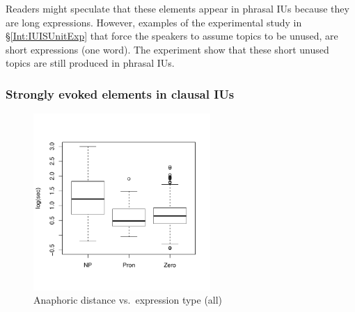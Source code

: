 Readers might speculate that
these elements appear in phrasal IUs because they are long expressions.
However, examples of the experimental study in \S \ref{Int:IUISUnitExp} that force the speakers to assume topics to be unused,
are short expressions (one word).
The experiment show that
these short unused topics are still produced in phrasal IUs.


\subsubsection{Strongly evoked elements in clausal IUs}\label{Int:Cor:Topic:CIU}

\begin{figure}
	\begin{center}
	\includegraphics[width=0.6\textwidth]{figure/DistExpType.pdf}
	\caption{Anaphoric distance vs.\ expression type (all)}
	\label{DistExpTypeF3}
	\end{center}
\end{figure}


